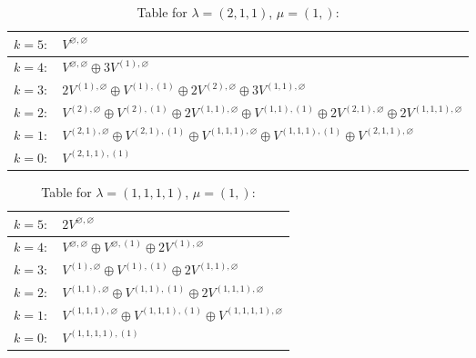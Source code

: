 \documentclass[a4paper,12pt]{article}
\begin{document}
\renewcommand{\arraystretch}{1.6} 
\begin{table}[H]
\centering
\caption{Table for $\lambda = (2, 1, 1)$, $\mu = (1,)$:}
\begin{tabular}{|>{\centering\arraybackslash}p{15cm}|}
\hline
 $k = 5: \quad V^{\varnothing, \varnothing} $ \\ \hline
 $k = 4: \quad V^{\varnothing, \varnothing} \oplus 3 V^{(1), \varnothing} $ \\ \hline
 $k = 3: \quad 2 V^{(1), \varnothing} \oplus V^{(1), (1)} \oplus 2 V^{(2), \varnothing} \oplus 3 V^{(1, 1), \varnothing} $ \\ \hline
 $k = 2: \quad V^{(2), \varnothing} \oplus V^{(2), (1)} \oplus 2 V^{(1, 1), \varnothing} \oplus V^{(1, 1), (1)} \oplus 2 V^{(2, 1), \varnothing} \oplus 2 V^{(1, 1, 1), \varnothing} $ \\ \hline
 $k = 1: \quad V^{(2, 1), \varnothing} \oplus V^{(2, 1), (1)} \oplus V^{(1, 1, 1), \varnothing} \oplus V^{(1, 1, 1), (1)} \oplus V^{(2, 1, 1), \varnothing} $ \\ \hline
 $k = 0: \quad V^{(2, 1, 1), (1)} $ \\ \hline
\end{tabular}
\end{table}

\renewcommand{\arraystretch}{1.6} 
\begin{table}[H]
\centering
\caption{Table for $\lambda = (1, 1, 1, 1)$, $\mu = (1,)$:}
\begin{tabular}{|>{\centering\arraybackslash}p{15cm}|}
\hline
 $k = 5: \quad 2 V^{\varnothing, \varnothing} $ \\ \hline
 $k = 4: \quad V^{\varnothing, \varnothing} \oplus V^{\varnothing, (1)} \oplus 2 V^{(1), \varnothing} $ \\ \hline
 $k = 3: \quad V^{(1), \varnothing} \oplus V^{(1), (1)} \oplus 2 V^{(1, 1), \varnothing} $ \\ \hline
 $k = 2: \quad V^{(1, 1), \varnothing} \oplus V^{(1, 1), (1)} \oplus 2 V^{(1, 1, 1), \varnothing} $ \\ \hline
 $k = 1: \quad V^{(1, 1, 1), \varnothing} \oplus V^{(1, 1, 1), (1)} \oplus V^{(1, 1, 1, 1), \varnothing} $ \\ \hline
 $k = 0: \quad V^{(1, 1, 1, 1), (1)} $ \\ \hline
\end{tabular}
\end{table}
\end{document}
